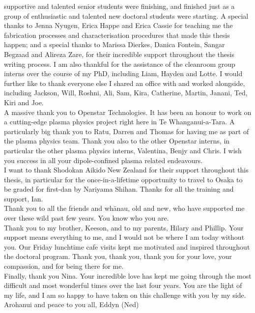 \documentclass[
  a4paper,
]{scrbook}
\begin{document}
\begin{spacing}{1.2}
supportive and talented senior students were finishing, and finished just as a group of enthusiastic and talented new doctoral students were starting. A special thanks to Jenna Nyugen, Erica Happe and Erica Cassie for teaching me the fabrication processes and characterisation procedures that made this thesis happen; and a special thanks to Marissa Dierkes, Danica Fontein, Sangar Begzaad and Alireza Zare, for their incredible support throughout the thesis writing process. I am also thankful for the assistance of the cleanroom group interns over the course of my PhD, including Liam, Hayden and Lotte. I would further like to thank everyone else I shared an office with and worked alongside, including Jackson, Will, Roshni, Ali, Sam, Kira, Catherine, Martin, Janani, Ted, Kiri and Joe. \\[5pt] A massive thank you to Openstar Technologies. It has been an honour to work on a cutting-edge plasma physics project right here in Te Whanganui-a-Tara. A particularly big thank you to Ratu, Darren and Thomas for having me as part of the plasma physics team. Thank you also to the other Openstar interns, in particular the other plasma physics interns, Valentina, Benjy and Chris. I wish you success in all your dipole-confined plasma related endeavours. \\[5pt] I want to thank Shodokan Aikido New Zealand for their support throughout this thesis, in particular for the once-in-a-lifetime opportunity to travel to Osaka to be graded for first-dan by Nariyama Shihan. Thanks for all the training and support, Ian. \\[5pt] Thank you to all the friends and whānau, old and new, who have supported me over these wild past few years. You know who you are. \\[5pt] Thank you to my brother, Keeson, and to my parents, Hilary and Phillip. Your support means everything to me, and I would not be where I am today without you. Our Friday lunchtime cafe visits kept me motivated and inspired throughout the doctoral program. Thank you, thank you, thank you for your love, your compassion, and for being there for me. \\[5pt] Finally, thank you Nina. Your incredible love has kept me going through the most difficult and most wonderful times over the last four years. You are the light of my life, and I am so happy to have taken on this challenge with you by my side. \\[5pt] Arohanui and peace to you all, Eddyn (Ned)

\fancyhf{} %
\thispagestyle{fancy} %
\renewcommand{\headrulewidth}{0pt}
\fancyfoot[R]{\thepage} %


\end{spacing}
\end{document}
